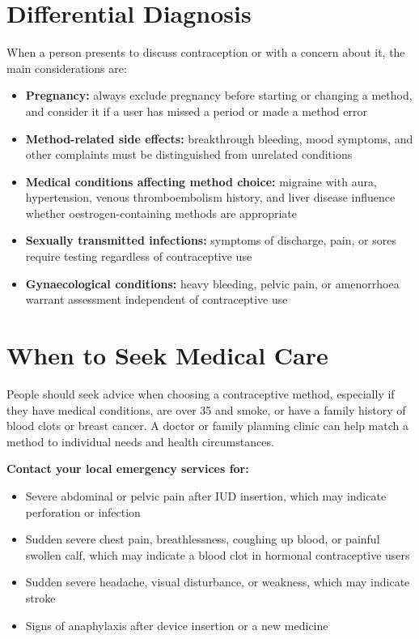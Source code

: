 \section*{Differential Diagnosis}
When a person presents to discuss contraception or with a concern about it, the main considerations are:
\begin{itemize}
    \item \textbf{Pregnancy:} always exclude pregnancy before starting or changing a method, and consider it if a user has missed a period or made a method error
    \item \textbf{Method-related side effects:} breakthrough bleeding, mood symptoms, and other complaints must be distinguished from unrelated conditions
    \item \textbf{Medical conditions affecting method choice:} migraine with aura, hypertension, venous thromboembolism history, and liver disease influence whether oestrogen-containing methods are appropriate
    \item \textbf{Sexually transmitted infections:} symptoms of discharge, pain, or sores require testing regardless of contraceptive use
    \item \textbf{Gynaecological conditions:} heavy bleeding, pelvic pain, or amenorrhoea warrant assessment independent of contraceptive use
\end{itemize}

\section*{When to Seek Medical Care}
People should seek advice when choosing a contraceptive method, especially if they have medical conditions, are over 35 and smoke, or have a family history of blood clots or breast cancer. A doctor or family planning clinic can help match a method to individual needs and health circumstances.

\textbf{Contact your local emergency services for:}
\begin{itemize}
    \item Severe abdominal or pelvic pain after IUD insertion, which may indicate perforation or infection
    \item Sudden severe chest pain, breathlessness, coughing up blood, or painful swollen calf, which may indicate a blood clot in hormonal contraceptive users
    \item Sudden severe headache, visual disturbance, or weakness, which may indicate stroke
    \item Signs of anaphylaxis after device insertion or a new medicine
\end{itemize}

